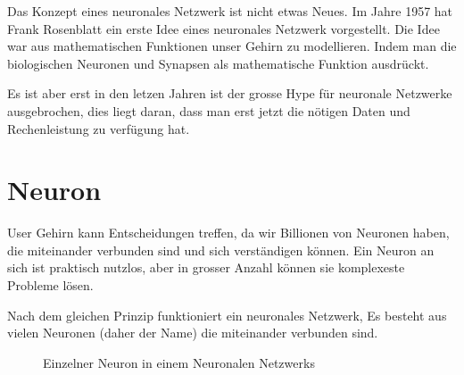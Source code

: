 \documentclass[12pt,a4paper]{report}
\begin{document}
Das Konzept eines neuronales Netzwerk ist nicht etwas Neues.
Im Jahre 1957 hat Frank Rosenblatt ein erste Idee eines neuronales Netzwerk vorgestellt.
Die Idee war aus mathematischen Funktionen unser Gehirn zu modellieren.
Indem man die biologischen Neuronen und Synapsen als mathematische Funktion ausdrückt.

Es ist aber erst in den letzen Jahren ist der grosse Hype für neuronale Netzwerke ausgebrochen,
dies liegt daran, dass man erst jetzt die nötigen Daten
und Rechenleistung zu verfügung hat.

\section{Neuron}\label{sec:neuron}
User Gehirn kann Entscheidungen treffen, da wir Billionen von Neuronen haben, die miteinander verbunden sind und sich
verständigen können.
Ein Neuron an sich ist praktisch nutzlos, aber in grosser Anzahl können sie komplexeste Probleme lösen.

Nach dem gleichen Prinzip funktioniert ein neuronales Netzwerk,
Es besteht aus vielen Neuronen (daher der Name) die miteinander verbunden sind.


\begin{figure}[h]
    \centering
{}
    \caption{Einzelner Neuron in einem Neuronalen Netzwerks}
    \label{fig:neuron1}
\end{figure}
\end{document}
